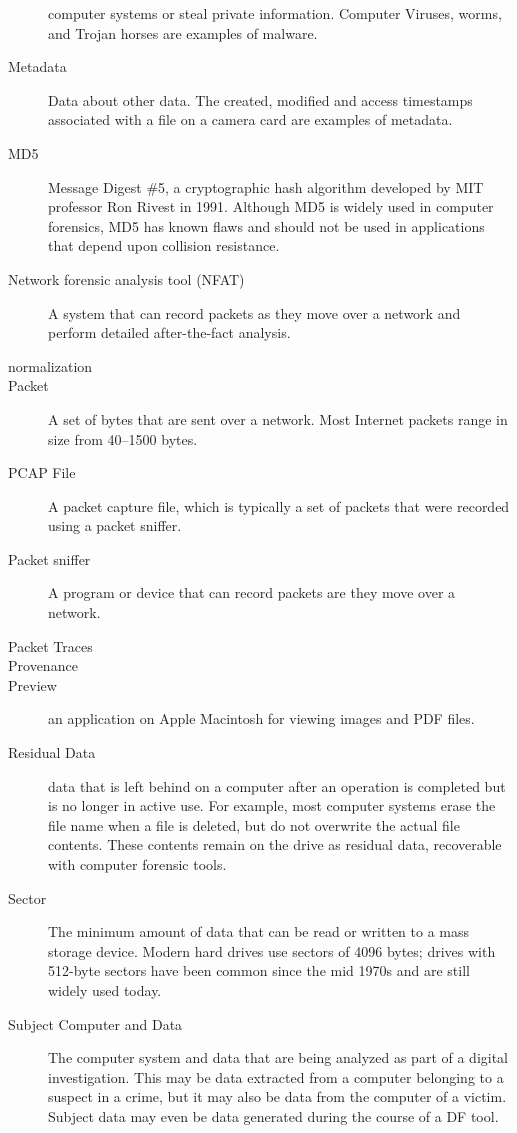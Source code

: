\begin{description}
  computer systems or steal private information. Computer Viruses,
  worms, and Trojan horses are examples of malware. 
\item[Metadata] Data about other data. The created, modified and
  access timestamps associated with a file on a camera card are
  examples of metadata.
\item[MD5] Message Digest \#5, a cryptographic hash algorithm
  developed by MIT professor Ron Rivest in 1991. Although MD5 is
  widely used in computer forensics, MD5 has known flaws and should
  not be used in applications that depend upon collision resistance.
 \item[Network forensic analysis tool (NFAT)] A system that can record
   packets as they move over a network and perform detailed
  after-the-fact analysis.
 \item[normalization]
 \item[Packet] A set of bytes that are sent over a network. Most
   Internet packets range in size from 40--1500 bytes.
 \item[PCAP File] A packet capture file, which is typically a set of
   packets that were recorded using a packet sniffer.
 \item[Packet sniffer] A program or device that can record packets are
   they move over a network.
 \item[Packet Traces]
 \item[Provenance]
\item[Preview] an application on Apple Macintosh for viewing images
  and PDF files. 
\item[Residual Data] data that is left behind on a computer after an
  operation is completed but is no longer in active use. For example,
  most computer systems erase the file name when a file is deleted,
  but do not overwrite the actual file contents. These contents remain
  on the drive as residual data, recoverable with computer forensic tools.
\item[Sector] The minimum amount of data that can be read or written
  to a mass storage device. Modern hard drives use sectors of 4096
  bytes; drives with 512-byte sectors have been common since the mid
  1970s and are still widely used today.
\item[Subject Computer and Data] The computer system and data that are
  being analyzed as part of a digital investigation. This may be data
  extracted from a computer belonging to a suspect in a crime, but it
  may also be data from the computer of a victim. Subject data may
  even be data generated during the course of a DF tool.

\end{description}
